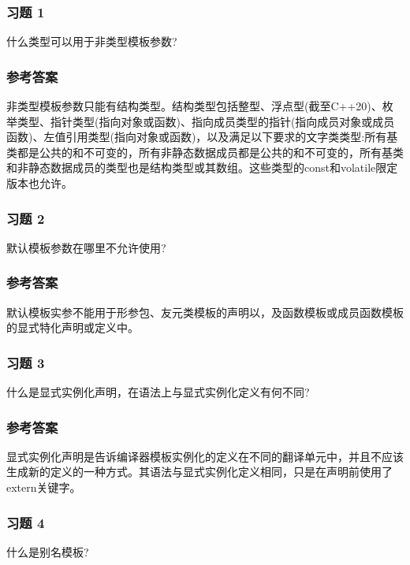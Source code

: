 \subsubsection{习题 1}

什么类型可以用于非类型模板参数?

\subsubsection{参考答案}

非类型模板参数只能有结构类型。结构类型包括整型、浮点型(截至C++20)、枚举类型、指针类型(指向对象或函数)、指向成员类型的指针(指向成员对象或成员函数)、左值引用类型(指向对象或函数)，以及满足以下要求的文字类类型:所有基类都是公共的和不可变的，所有非静态数据成员都是公共的和不可变的，所有基类和非静态数据成员的类型也是结构类型或其数组。这些类型的const和volatile限定版本也允许。


\subsubsection{习题 2}

默认模板参数在哪里不允许使用?

\subsubsection{参考答案}

默认模板实参不能用于形参包、友元类模板的声明以，及函数模板或成员函数模板的显式特化声明或定义中。

\subsubsection{习题 3}

什么是显式实例化声明，在语法上与显式实例化定义有何不同?

\subsubsection{参考答案}

显式实例化声明是告诉编译器模板实例化的定义在不同的翻译单元中，并且不应该生成新的定义的一种方式。其语法与显式实例化定义相同，只是在声明前使用了extern关键字。

\subsubsection{习题 4}

什么是别名模板?

